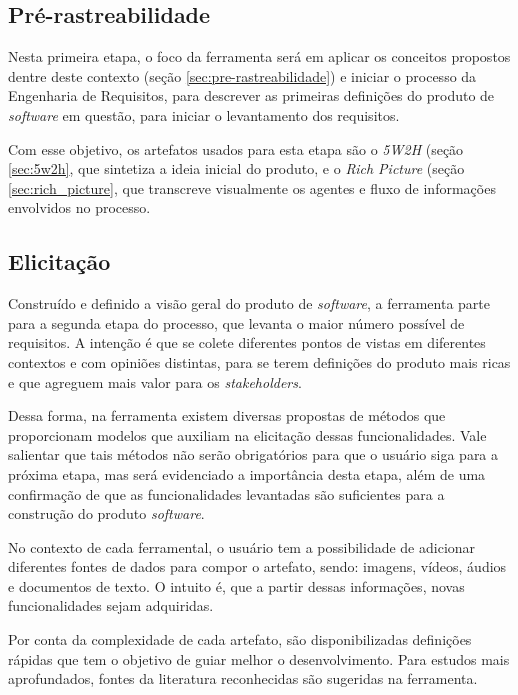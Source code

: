 \subsection{Pré-rastreabilidade}

Nesta primeira etapa, o foco da ferramenta será em aplicar os conceitos propostos dentre deste contexto (seção \ref{sec:pre-rastreabilidade}) e iniciar o processo da Engenharia de Requisitos, para descrever as primeiras definições do produto de \textit{software} em questão, para iniciar o levantamento dos requisitos.

Com esse objetivo, os artefatos usados para esta etapa são o \textit{5W2H} (seção \ref{sec:5w2h}, que sintetiza a ideia inicial do produto, e o \textit{Rich Picture} (seção \ref{sec:rich_picture}, que transcreve visualmente os agentes e fluxo de informações envolvidos no processo.

\subsection{Elicitação}

\label{sec:proc_elicitacao}

Construído e definido a visão geral do produto de \textit{software}, a ferramenta parte para a segunda etapa do processo, que levanta o maior número possível de requisitos. A intenção é que se colete diferentes pontos de vistas em diferentes contextos e com opiniões distintas, para se terem definições do produto mais ricas e que agreguem mais valor para os \textit{stakeholders}.

Dessa forma, na ferramenta existem diversas propostas de métodos que proporcionam modelos que auxiliam na elicitação dessas funcionalidades. Vale salientar que tais métodos não serão obrigatórios para que o usuário siga para a próxima etapa, mas será evidenciado a importância desta etapa, além de uma confirmação de que as funcionalidades levantadas são suficientes para a construção do produto \textit{software}.

No contexto de cada ferramental, o usuário tem a possibilidade de adicionar diferentes fontes de dados para compor o artefato, sendo: imagens, vídeos, áudios e documentos de texto. O intuito é, que a partir dessas informações, novas funcionalidades sejam adquiridas.

Por conta da complexidade de cada artefato, são disponibilizadas definições rápidas que tem o objetivo de guiar melhor o desenvolvimento. Para estudos mais aprofundados, fontes da literatura reconhecidas são sugeridas na ferramenta.

